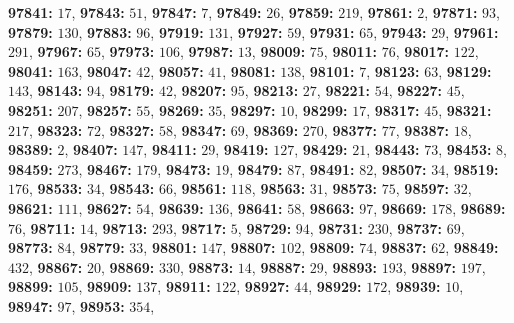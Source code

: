 \textsf{\bfseries 97841:} $17$, \textsf{\bfseries 97843:} $51$, \textsf{\bfseries 97847:} $7$, \textsf{\bfseries 97849:} $26$, \textsf{\bfseries 97859:} $219$, \textsf{\bfseries 97861:} $2$, \textsf{\bfseries 97871:} $93$, \textsf{\bfseries 97879:} $130$, \textsf{\bfseries 97883:} $96$, \textsf{\bfseries 97919:} $131$, \textsf{\bfseries 97927:} $59$, \textsf{\bfseries 97931:} $65$, \textsf{\bfseries 97943:} $29$, \textsf{\bfseries 97961:} $291$, \textsf{\bfseries 97967:} $65$, \textsf{\bfseries 97973:} $106$, \textsf{\bfseries 97987:} $13$, \textsf{\bfseries 98009:} $75$, \textsf{\bfseries 98011:} $76$, \textsf{\bfseries 98017:} $122$, \textsf{\bfseries 98041:} $163$, \textsf{\bfseries 98047:} $42$, \textsf{\bfseries 98057:} $41$, \textsf{\bfseries 98081:} $138$, \textsf{\bfseries 98101:} $7$, \textsf{\bfseries 98123:} $63$, \textsf{\bfseries 98129:} $143$, \textsf{\bfseries 98143:} $94$, \textsf{\bfseries 98179:} $42$, \textsf{\bfseries 98207:} $95$, \textsf{\bfseries 98213:} $27$, \textsf{\bfseries 98221:} $54$, \textsf{\bfseries 98227:} $45$, \textsf{\bfseries 98251:} $207$, \textsf{\bfseries 98257:} $55$, \textsf{\bfseries 98269:} $35$, \textsf{\bfseries 98297:} $10$, \textsf{\bfseries 98299:} $17$, \textsf{\bfseries 98317:} $45$, \textsf{\bfseries 98321:} $217$, \textsf{\bfseries 98323:} $72$, \textsf{\bfseries 98327:} $58$, \textsf{\bfseries 98347:} $69$, \textsf{\bfseries 98369:} $270$, \textsf{\bfseries 98377:} $77$, \textsf{\bfseries 98387:} $18$, \textsf{\bfseries 98389:} $2$, \textsf{\bfseries 98407:} $147$, \textsf{\bfseries 98411:} $29$, \textsf{\bfseries 98419:} $127$, \textsf{\bfseries 98429:} $21$, \textsf{\bfseries 98443:} $73$, \textsf{\bfseries 98453:} $8$, \textsf{\bfseries 98459:} $273$, \textsf{\bfseries 98467:} $179$, \textsf{\bfseries 98473:} $19$, \textsf{\bfseries 98479:} $87$, \textsf{\bfseries 98491:} $82$, \textsf{\bfseries 98507:} $34$, \textsf{\bfseries 98519:} $176$, \textsf{\bfseries 98533:} $34$, \textsf{\bfseries 98543:} $66$, \textsf{\bfseries 98561:} $118$, \textsf{\bfseries 98563:} $31$, \textsf{\bfseries 98573:} $75$, \textsf{\bfseries 98597:} $32$, \textsf{\bfseries 98621:} $111$, \textsf{\bfseries 98627:} $54$, \textsf{\bfseries 98639:} $136$, \textsf{\bfseries 98641:} $58$, \textsf{\bfseries 98663:} $97$, \textsf{\bfseries 98669:} $178$, \textsf{\bfseries 98689:} $76$, \textsf{\bfseries 98711:} $14$, \textsf{\bfseries 98713:} $293$, \textsf{\bfseries 98717:} $5$, \textsf{\bfseries 98729:} $94$, \textsf{\bfseries 98731:} $230$, \textsf{\bfseries 98737:} $69$, \textsf{\bfseries 98773:} $84$, \textsf{\bfseries 98779:} $33$, \textsf{\bfseries 98801:} $147$, \textsf{\bfseries 98807:} $102$, \textsf{\bfseries 98809:} $74$, \textsf{\bfseries 98837:} $62$, \textsf{\bfseries 98849:} $432$, \textsf{\bfseries 98867:} $20$, \textsf{\bfseries 98869:} $330$, \textsf{\bfseries 98873:} $14$, \textsf{\bfseries 98887:} $29$, \textsf{\bfseries 98893:} $193$, \textsf{\bfseries 98897:} $197$, \textsf{\bfseries 98899:} $105$, \textsf{\bfseries 98909:} $137$, \textsf{\bfseries 98911:} $122$, \textsf{\bfseries 98927:} $44$, \textsf{\bfseries 98929:} $172$, \textsf{\bfseries 98939:} $10$, \textsf{\bfseries 98947:} $97$, \textsf{\bfseries 98953:} $354$, 
